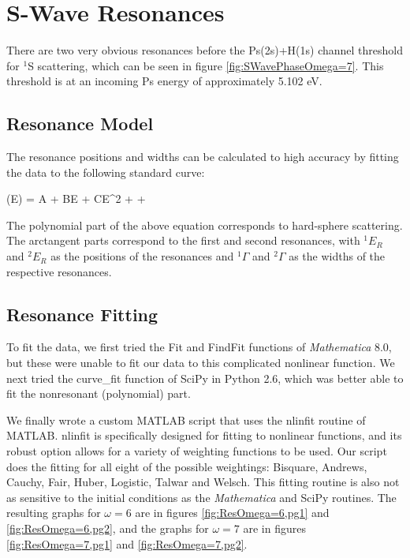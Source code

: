 \documentclass[Dissertation.tex]{subfiles}
\begin{document}
\section{S-Wave Resonances}
\label{sec:SWaveResonances}

There are two very obvious resonances before the Ps(2s)+H(1s) channel threshold for $^1$S scattering, which can be seen in figure \ref{fig:SWavePhaseOmega=7}.  This threshold is at an incoming Ps energy of approximately 5.102 eV.  

\subsection{Resonance Model}
\label{sec:ResonanceModel}
The resonance positions and widths can be calculated to high accuracy by fitting the data to the following standard curve:

\beq
\label{eq:ResonanceCurve}
\delta(E) = A + BE + CE^2 + \arctan{} + \arctan{}
\eeq

\noindent The polynomial part of the above equation corresponds to hard-sphere scattering.  The arctangent parts correspond to the first and second resonances, with $^1E_R$ and $^2E_R$ as the positions of the resonances and $^1\Gamma$ and $^2\Gamma$ as the widths of the respective resonances.

\subsection{Resonance Fitting}
\label{sec:ResonanceFit}
To fit the data, we first tried the Fit and FindFit functions of \textit{Mathematica} 8.0, but these were unable to fit our data to this complicated nonlinear function.  We next tried the curve\_fit function of SciPy in Python 2.6, which was better able to fit the nonresonant (polynomial) part.

We finally wrote a custom MATLAB script that uses the nlinfit routine of MATLAB.  nlinfit is specifically designed for fitting to nonlinear functions, and its robust option allows for a variety of weighting functions to be used.  Our script does the fitting for all eight of the possible weightings: Bisquare, Andrews, Cauchy, Fair, Huber, Logistic, Talwar and Welsch.  This fitting routine is also not as sensitive to the initial conditions as the \textit{Mathematica} and SciPy routines.  The resulting graphs for $\omega = 6$ are in figures \ref{fig:ResOmega=6,pg1} and \ref{fig:ResOmega=6,pg2}, and the graphs for $\omega = 7$ are in figures \ref{fig:ResOmega=7,pg1} and \ref{fig:ResOmega=7,pg2}.
\end{document}
